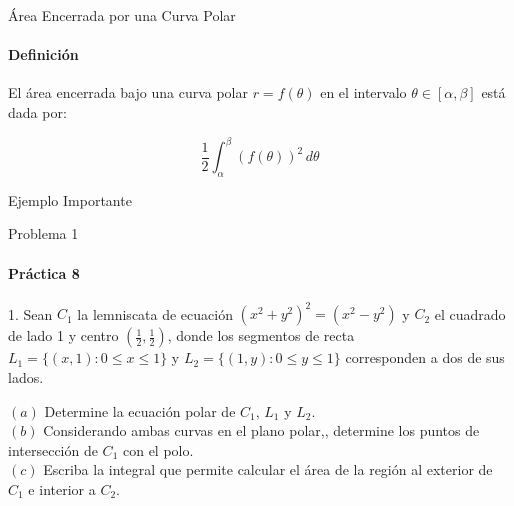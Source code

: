 \documentclass{plantillaPPT}
\begin{document}
\primeraDiapo

\begin{frame}{Área Encerrada por una Curva Polar}
\framesubtitle{Definición}

\begin{definicion}
    El área encerrada bajo una curva polar \(r=f(\theta)\) en el intervalo \(\theta\in[\alpha, \beta]\) está dada por:

\[\frac{1}{2}\int_\alpha^\beta (f(\theta))^2\, d\theta\]

\end{definicion}
\end{frame}

\begin{frame}{Ejemplo Importante}
\centering
\vspace{0.3cm}
\end{frame}



\begin{frame}{Problema 1}
\framesubtitle{Práctica 8}

1. Sean $C_1$ la lemniscata de ecuación $(x^2+y^2)^2 = (x^2-y^2)$ y $C_2$ el cuadrado de lado 1 y centro $(\frac{1}{2}, \frac{1}{2})$, donde los segmentos de recta $L_1 = \{(x,1):0\leq x \leq1\}$ y $L_2 = \{(1,y):0\leq y\leq1\}$ corresponden a dos de sus lados.

$(a)$ Determine la ecuación polar de $C_1$, $L_1$ y $L_2$. \\
$(b)$ Considerando ambas curvas en el plano polar,, determine los puntos de intersección de $C_1$ con el polo. \\
$(c)$ Escriba la integral que permite calcular el área de la región al exterior de $C_1$ e interior a $C_2$.
    
\end{frame}
\end{document}
